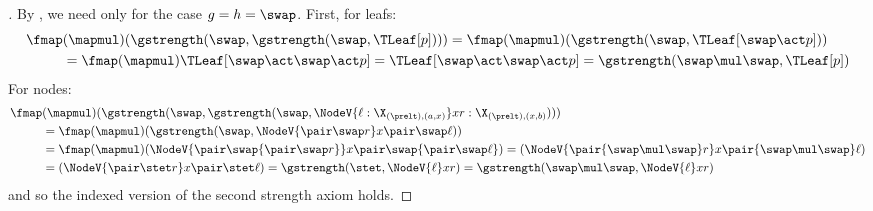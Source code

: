 \begin{proof}[]
  By ,
  we need only for the case $g = h = \swap$.
  First, for leafs:
  \begin{align*}
    \fmap&(\mapmul)
  (\gstrength(\swap,
   \gstrength(\swap, \TLeaf[p])))
   =
   \fmap(\mapmul)
  (\gstrength(\swap,
   \TLeaf[\swap\act p]))
   \\&=
   \fmap(\mapmul)
   \TLeaf[\swap\act\swap\act p]
   =
   \TLeaf[\swap\act\swap\act p]
   =
   \gstrength(\swap\mul\swap, \TLeaf[p])
  \end{align*}
  For nodes:
  \begin{align*}
    \fmap&(\mapmul)
  (\gstrength(\swap,
   \gstrength(\swap, \NodeV{\ell : \X_{(\prelt), (a,x)}}x{r : \X_{(\prelt), (x,b)}})))
   \\&=
   \fmap(\mapmul)
  (\gstrength(\swap,
   \NodeV{\pair\swap r}x{\pair\swap\ell}))
   \\&=
   \fmap(\mapmul)
   (\NodeV{\pair\swap{\pair\swap r}}x{\pair\swap{\pair\swap\ell}})
   =
   (\NodeV{\pair{\swap\mul\swap}r}x{\pair{\swap\mul\swap}\ell})
   \\&=
   (\NodeV{\pair\stet r}x{\pair\stet\ell})
   = \gstrength(\stet,
   \NodeV{\ell}x{r})
= \gstrength(\swap\mul\swap,
   \NodeV{\ell}x{r})
  \end{align*}
  and so the indexed version of the second strength axiom holds.
\end{proof}
